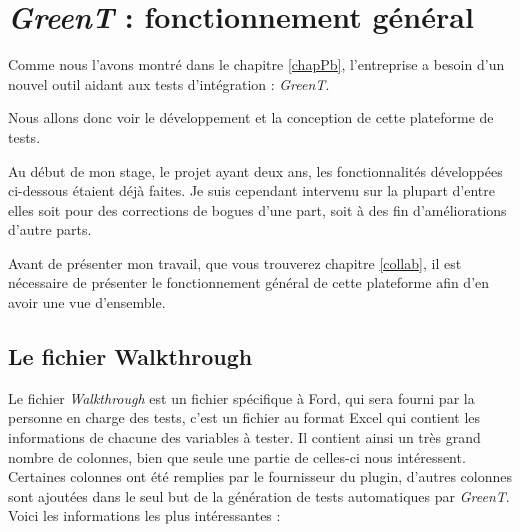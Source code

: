 \chapter{\textit{GreenT} : fonctionnement général}\label{chapGreent}
\putminitoc

Comme nous l'avons montré dans le chapitre \ref{chapPb}, l'entreprise a besoin d'un nouvel outil aidant aux tests d'intégration : \textit{GreenT}. 

Nous allons donc voir le développement et la conception de cette plateforme de tests.

Au début de mon stage, le projet ayant deux ans, les fonctionnalités développées ci-dessous étaient déjà faites. Je suis cependant intervenu
sur la plupart d'entre elles soit pour des corrections de bogues d'une part, soit à des fin d'améliorations d'autre parts.

Avant de présenter mon travail, que vous trouverez chapitre \ref{collab}, il est nécessaire de présenter le fonctionnement général de
cette plateforme afin d'en avoir une vue d'ensemble.

\section{Le fichier Walkthrough}\label{wt}
Le fichier \textit{Walkthrough} est un fichier spécifique à Ford, qui sera fourni par la personne en charge des tests, c'est un fichier au format Excel qui contient les informations
de chacune des variables à tester. Il contient ainsi un très grand nombre de colonnes, bien que seule une partie de celles-ci nous
intéressent. Certaines colonnes ont été remplies par le fournisseur du plugin, d'autres colonnes sont ajoutées dans le seul but de la
génération de tests automatiques par \textit{GreenT}. Voici les informations les plus intéressantes : 

